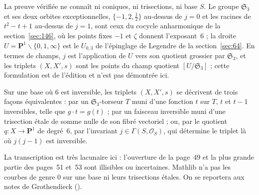 \noindent La preuve vérifiée ne connaît ni coniques, ni trisections, ni base $S$. Le groupe $\mathfrak S_3$ et ses deux orbites exceptionnelles, $\{-1, 2, \frac12\}$ au-dessus de $j = 0$ et les racines de $t^2 - t + 1$ au-dessus de $j = 1$, sont ceux du cocycle anharmonique de la section~\ref{sec:146}, où les points fixes $-1$ et $\zeta$ donnent l'exposant~$6$ ; la droite $U = \mathbf P^1 \smallsetminus \{0, 1, \infty\}$ est le $U_{0,3}$ de l'épinglage de Legendre de la section~\ref{sec:64}. En termes de champs, $j$ est l'application de $U$ vers son quotient grossier par $\mathfrak S_3$, et les triplets $(X, X', s)$ sont les points du champ quotient $[U/\mathfrak S_3]$ ; cette formulation est de l'édition et n'est pas démontrée ici.

\begin{encadre}
\begin{theoreme*}\nonverifie
Sur une base où $6$ est inversible, les triplets $(X, X', s)$ se décrivent de trois façons équivalentes : par un $\mathfrak S_3$-torseur $T$ muni d'une fonction $t$ sur $T$, $t$ et $t - 1$ inversibles, telle que $g \cdot t = g(t)$ ; par un faisceau inversible muni d'une trisection étale de somme nulle de son fibré vectoriel ; ou, par le quotient $q : X \to \mathbf P^1$ de degré~$6$, par l'invariant $j \in \Gamma(S, \mathcal O_S)$, qui détermine le triplet là où $j(j-1)$ est inversible.
\end{theoreme*}
\end{encadre}
{\small La transcription est très lacunaire ici : l'ouverture de la page~49 et la plus grande partie des pages~51 et~53 sont illisibles ou incertaines. Mathlib n'a pas les courbes de genre $0$ sur une base ni leurs trisections étales. On se reportera aux notes de Grothendieck ().\par}

